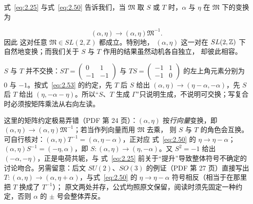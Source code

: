 式~\eqref{eq:2.25} 与式~\eqref{eq:2.50} 告诉我们，当 ${\mathfrak{M}}$ 取
$S$ 或 $T$ 时，$\alpha$ 与 $\eta$ 在 ${\mathfrak{M}}$ 下的变换为

\setcounter{equation}{52}
\begin{equation}\label{eq:2.53}
  (\alpha,\eta)\to (\alpha,\eta){\mathfrak{M}}^{-1}.
\end{equation}
 因此
这对任意 ${\mathfrak{M}}\in SL(2,\mathbb{Z})$ 都成立。特别地，
$(\alpha,\eta)$ 这一对在
$SL(2,{\mathbb{Z}})$ 下自然地变换；而我们关于 $S$ 与 $T$ 作用的结果虽然动机各自独立，
却彼此相容。

\begin{yizhu}[易错点]
$S$ 与 $T$ 并不交换：$ST=\left(\begin{smallmatrix}0&1\\-1&-1\end{smallmatrix}\right)$ 与 $TS=\left(\begin{smallmatrix}-1&1\\-1&0\end{smallmatrix}\right)$ 的左上角元素分别为 $0$ 与 $-1$。按式~\eqref{eq:2.53} 的约定，先 $T$ 后 $S$ 给出 $(\alpha,\eta)\to(\eta-\alpha,-\alpha)$，先 $S$ 后 $T$ 给出 $(\eta,-\alpha-\eta)$。所以“$S$、$T$ 生成 $\Gamma$”只说明生成，不说明可交换；写复合时必须按矩阵乘法从右向左读。
\end{yizhu}

\begin{yizhu}[易错点]这里的矩阵约定极易弄错（PDF 第 24 页）：$(\alpha,\eta)$ 按\emph{行向量}变换，即
$(\alpha,\eta)\to(\alpha,\eta){\mathfrak{M}}^{-1}$；若当作列向量而用 ${\mathfrak{M}}$ 去乘，
则 $S$ 与 $T$ 的角色会互换。可自行核对：$(\alpha,\eta)T^{-1}=(\alpha,\eta-\alpha)$，正对应
式~\eqref{eq:2.50} 的 $\eta\to\eta-\alpha$；$(\alpha,\eta)S^{-1}=(-\eta,\alpha)$，即
$S:(\alpha,\eta)\to(\eta,-\alpha)$。又 $S^2=-1$ 给出 $(-\alpha,-\eta)$，正是电荷共轭，与
式~\eqref{eq:2.25} 前关于“提升”导致整体符号不确定的讨论吻合。另需留意：后文 $SU(2)$、$SO(3)$ 的例证（PDF 第 27 页）直接写出
$T:(\alpha,\eta)\to(\alpha,\eta+\alpha)$，与式~\eqref{eq:2.50} 的 $\eta\to\eta-\alpha$ 符号相反（相当于在那里把 $T$ 换成了 $T^{-1}$）；
原文两处并存，公式均照原文保留，阅读时须先固定一种约定，否则 $\alpha$ 的 $\pm$ 号会整体弄反。\end{yizhu}

